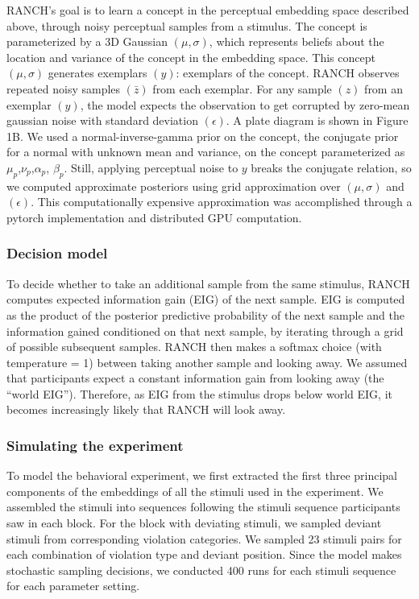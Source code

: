 \documentclass[10pt, letterpaper]{article}
\begin{document}
RANCH's goal is to learn a concept in the perceptual embedding space
described above, through noisy perceptual samples from a stimulus. The
concept is parameterized by a 3D Gaussian \((\mu,\sigma)\), which
represents beliefs about the location and variance of the concept in the
embedding space. This concept \((\mu,\sigma)\) generates exemplars
\((y)\): exemplars of the concept. RANCH observes repeated noisy samples
\((\bar{z})\) from each exemplar. For any sample \((z)\) from an
exemplar \((y)\), the model expects the observation to get corrupted by
zero-mean gaussian noise with standard deviation \((\epsilon)\). A plate
diagram is shown in Figure 1B. We used a normal-inverse-gamma prior on
the concept, the conjugate prior for a normal with unknown mean and
variance, on the concept parameterized as
\(\mu_{p}\),\(\nu_{p}\),\(\alpha_{p}\), \(\beta_{p}\). Still, applying
perceptual noise to \(y\) breaks the conjugate relation, so we computed
approximate posteriors using grid approximation over \((\mu,\sigma)\)
and \((\epsilon)\). This computationally expensive approximation was
accomplished through a pytorch implementation and distributed GPU
computation.

\hypertarget{decision-model}{%
\subsubsection{Decision model}\label{decision-model}}

To decide whether to take an additional sample from the same stimulus,
RANCH computes expected information gain (EIG) of the next sample. EIG
is computed as the product of the posterior predictive probability of
the next sample and the information gained conditioned on that next
sample, by iterating through a grid of possible subsequent samples.
RANCH then makes a softmax choice (with temperature = 1) between taking
another sample and looking away. We assumed that participants expect a
constant information gain from looking away (the ``world EIG'').
Therefore, as EIG from the stimulus drops below world EIG, it becomes
increasingly likely that RANCH will look away.

\hypertarget{simulating-the-experiment}{%
\subsubsection{Simulating the
experiment}\label{simulating-the-experiment}}

To model the behavioral experiment, we first extracted the first three
principal components of the embeddings of all the stimuli used in the
experiment. We assembled the stimuli into sequences following the
stimuli sequence participants saw in each block. For the block with
deviating stimuli, we sampled deviant stimuli from corresponding
violation categories. We sampled 23 stimuli pairs for each combination
of violation type and deviant position. Since the model makes stochastic
sampling decisions, we conducted 400 runs for each stimuli sequence for
each parameter setting.
\end{document}
